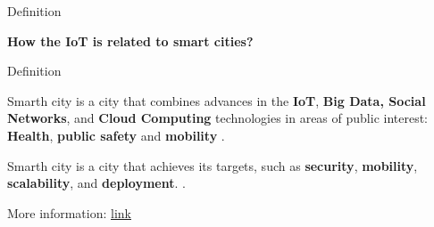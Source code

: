 \documentclass[10pt]{beamer}
\newcommand{\chref}[2]{	\href{#1}{{\usebeamercolor[bg]{Feather}#2}}}
\newcommand{\chref}[3][blue]{\href{#2}{\color{#1}{#3}}}%
\newcommand{\1}{
        	\setbeamertemplate{background}{
        		\texttt{[image: img/1]}
        		\tikz[overlay] \fill[fill opacity=0.75,fill=white] (0,0) rectangle (-\paperwidth,\paperheight);
        	}
}
\begin{document}
\begin{frame}{Definition}{}
	\begin{block}{}
		\centering
		\textbf{How the IoT is related to smart cities?}
	\end{block}
\end{frame}

\begin{frame}{Definition}{}
	\begin{block}{}
		Smarth city is a city that combines advances in the \textbf{IoT}, \textbf{Big Data, Social Networks}, and \textbf{Cloud Computing} technologies in areas of public interest: \textbf{Health}, \textbf{public safety} and \textbf{mobility} \cite{del2019design}.
	\end{block} \pause

	\begin{block}{}
		Smarth city is a city that achieves its targets, such as \textbf{security}, \textbf{mobility}, \textbf{scalability}, and \textbf{deployment}. \cite{elsaeidy2019intrusion}.
	\end{block}

	\vspace{0.5cm}

	More information: \chref{https://ieeexplore.ieee.org/document/9086495}{link}
\end{frame}



\end{document}
